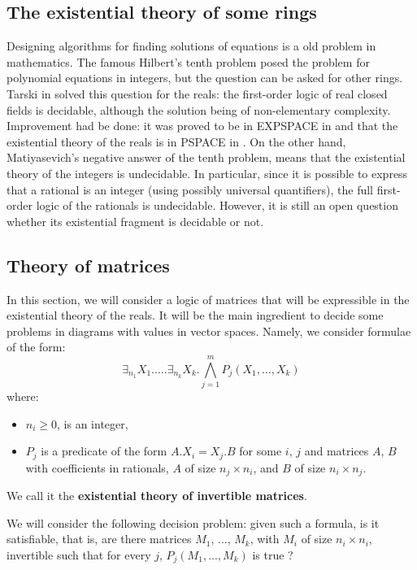\subsection{The existential theory of some rings}

Designing algorithms for finding solutions of equations is a old problem in mathematics. The famous Hilbert's tenth problem posed the problem for polynomial equations in integers, but the question can be asked for other rings. Tarski in \cite{tarski51} solved this question for the reals: the first-order logic of real closed fields is decidable, although the solution being of non-elementary complexity. Improvement had be done: it was proved to be in EXPSPACE in \cite{benor86} and that the existential theory of the reals is in PSPACE in \cite{canny88}. On the other hand, Matiyasevich's negative answer of the tenth problem, means that the existential theory of the integers is undecidable. In particular, since it is possible to express that a rational is an integer (using possibly universal quantifiers), the full first-order logic of the rationals is undecidable. However, it is still an open question whether its existential fragment is decidable or not.

\subsection{Theory of matrices}

In this section, we will consider a logic of matrices that will be expressible in the existential theory of the reals. It will be the main ingredient to decide some problems in diagrams with values in vector spaces. Namely, we consider formulae of the form:
$$\exists_{n_1}X_1.\ldots.\exists_{n_k}X_k. \bigwedge\limits_{j = 1}^m P_j(X_1, \ldots, X_k)$$
where:
\begin{itemize}
	\item $n_i \geq 0$, is an integer,
	\item $P_j$ is a predicate of the form $A.X_i = X_j.B$ for some $i$, $j$ and matrices $A$, $B$ with coefficients in rationals, $A$ of size $n_j\times n_i$, and $B$ of size $n_i\times n_j$.
\end{itemize}
We call it the \textbf{existential theory of invertible matrices}.

We will consider the following decision problem: given such a formula, is it satisfiable, that is, are there matrices $M_1$, ..., $M_k$, with $M_i$ of size $n_i\times n_i$, invertible such that for every $j$, $P_j(M_1, ..., M_k)$ is true ?

